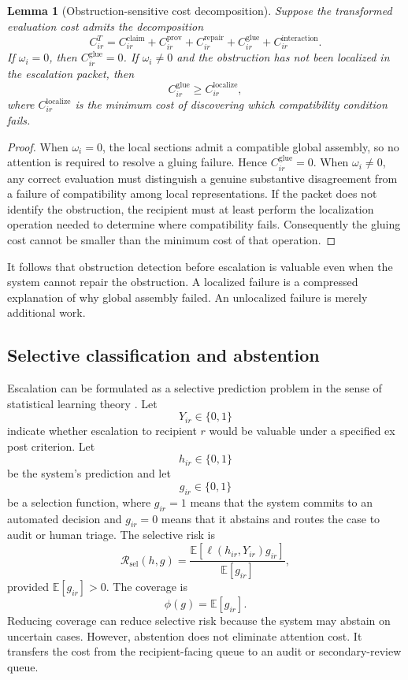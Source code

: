 \documentclass[11pt]{article}
\newtheorem{lemma}[definition]{Lemma}
\theoremstyle{definition}
\newcommand{\E}{\mathbb{E}}
\begin{document}
\begin{lemma}[Obstruction-sensitive cost decomposition]
Suppose the transformed evaluation cost admits the decomposition
\[
C_{ir}^{T}
=
C_{ir}^{\mathrm{claim}}
+
C_{ir}^{\mathrm{prov}}
+
C_{ir}^{\mathrm{repair}}
+
C_{ir}^{\mathrm{glue}}
+
C_{ir}^{\mathrm{interaction}}.
\]
If \(\omega_i=0\), then \(C_{ir}^{\mathrm{glue}}=0\). If \(\omega_i\neq 0\) and the obstruction has not been localized in the escalation packet, then
\[
C_{ir}^{\mathrm{glue}}
\geq
C_{ir}^{\mathrm{localize}},
\]
where \(C_{ir}^{\mathrm{localize}}\) is the minimum cost of discovering which compatibility condition fails.
\end{lemma}

\begin{proof}
When \(\omega_i=0\), the local sections admit a compatible global assembly, so no attention is required to resolve a gluing failure. Hence \(C_{ir}^{\mathrm{glue}}=0\). When \(\omega_i\neq0\), any correct evaluation must distinguish a genuine substantive disagreement from a failure of compatibility among local representations. If the packet does not identify the obstruction, the recipient must at least perform the localization operation needed to determine where compatibility fails. Consequently the gluing cost cannot be smaller than the minimum cost of that operation.
\end{proof}

It follows that obstruction detection before escalation is valuable even when the system cannot repair the obstruction. A localized failure is a compressed explanation of why global assembly failed. An unlocalized failure is merely additional work.

\subsection{Selective classification and abstention}

Escalation can be formulated as a selective prediction problem in the sense of statistical learning theory \cite{vapnik1998,geifman2017}. Let
\[
Y_{ir}\in\{0,1\}
\]
indicate whether escalation to recipient \(r\) would be valuable under a specified ex post criterion. Let
\[
h_{ir}\in\{0,1\}
\]
be the system's prediction and let
\[
g_{ir}\in\{0,1\}
\]
be a selection function, where \(g_{ir}=1\) means that the system commits to an automated decision and \(g_{ir}=0\) means that it abstains and routes the case to audit or human triage. The selective risk is
\[
\mathcal{R}_{\mathrm{sel}}(h,g)
=
\frac{
\E\!\left[
\ell(h_{ir},Y_{ir})g_{ir}
\right]
}{
\E[g_{ir}]
},
\]
provided \(\E[g_{ir}]>0\). The coverage is
\[
\phi(g)=\E[g_{ir}].
\]
Reducing coverage can reduce selective risk because the system may abstain on uncertain cases. However, abstention does not eliminate attention cost. It transfers the cost from the recipient-facing queue to an audit or secondary-review queue.
\end{document}
